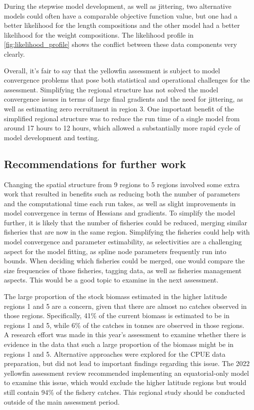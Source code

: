 During the stepwise model development, as well as jittering, two alternative models could often have a comparable objective function value, but one had a better likelihood for the length compositions and the other model had a better likelihood for the weight compositions. The likelihood profile in \autoref{fig:likelihood_profile} shows the conflict between these data components very clearly.

Overall, it's fair to say that the yellowfin assessment is subject to model convergence problems that pose both statistical and operational challenges for the assessment. Simplifying the regional structure has not solved the model convergence issues in terms of large final gradients and the need for jittering, as well as estimating zero recruitment in region 3. One important benefit of the simplified regional structure was to reduce the run time of a single model from around 17 hours to 12 hours, which allowed a substantially more rapid cycle of model development and testing.

\subsection{Recommendations for further work}
\label{sec:recommendations_further_work}

Changing the spatial structure from 9 regions to 5 regions involved some extra work that resulted in benefits such as reducing both the number of parameters and the computational time each run takes, as well as slight improvements in model convergence in terms of Hessians and gradients. To simplify the model further, it is likely that the number of fisheries could be reduced, merging similar fisheries that are now in the same region. Simplifying the fisheries could help with model convergence and parameter estimability, as selectivities are a challenging aspect for the model fitting, as spline node parameters frequently run into bounds. When deciding which fisheries could be merged, one would compare the size frequencies of those fisheries, tagging data, as well as fisheries management aspects. This would be a good topic to examine in the next assessment.

The large proportion of the stock biomass estimated in the higher latitude regions 1 and 5 are a concern, given that there are almost no catches observed in those regions. Specifically, 41\% of the current biomass is estimated to be in regions 1 and 5, while 6\% of the catches in tonnes are observed in those regions. A research effort was made in this year's assessment to examine whether there is evidence in the data that such a large proportion of the biomass might be in regions 1 and 5. Alternative approaches were explored for the CPUE data preparation, but did not lead to important findings regarding this issue. The 2022 yellowfin assessment review recommended implementing an equatorial-only model to examine this issue, which would exclude the higher latitude regions but would still contain 94\% of the fishery catches. This regional study should be conducted outside of the main assessment period.

